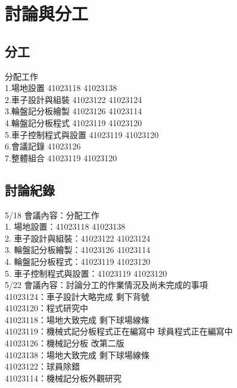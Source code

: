 \chapter{討論與分工}
\renewcommand{\baselinestretch}{10.0} %
\setcounter{page}{26}  %
\fontsize{14pt}{2.5pt}\sectionef

\section{分工}
分配工作\\
1.場地設置 41023118 41023138\\
2.車子設計與組裝 41023122 41023124\\
3.輪盤記分板繪製 41023126 41023114\\
4.輪盤記分板程式 41023119 41023120\\
5.車子控制程式與設置 41023119 41023120\\
6.會議記錄 41023126\\
7.整體組合 41023119 41023120\\

\section{討論紀錄}

5/18 會議內容：分配工作\\
1. 場地設置：41023118 41023138\\
2. 車子設計與組裝：41023122 41023124\\
3. 輪盤記分板繪製：41023126 41023114\\
4. 輪盤記分板程式：41023119 41023120\\
5. 車子控制程式與設置：41023119 41023120\\

5/22 會議內容：討論分工的作業情況及尚未完成的事項\\
41023124：車子設計大略完成 剩下背號\\
41023120：程式研究中\\
41023118：場地大致完成 剩下球場線條\\
41023119：機械式記分板程式正在編寫中 球員程式正在編寫中\\
41023126：機械記分板 改第二版\\
41023138：場地大致完成 剩下球場線條\\
41023122：球員除錯\\
41023114：機械記分板外觀研究\\


